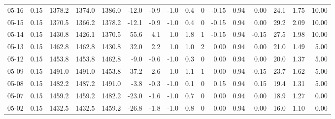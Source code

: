 \begin{threeparttable}
{\begin{tabular}{lrrrrrrrrrrrrrrr}
  05-16 &     0.15 & 1378.2 & 1374.0 & 1386.0 &      -12.0 &           -0.9 &                     -1.0 &                 0.4 &              0 &      -0.15 &      0.94 &           0.00 &             24.1 &            1.75 &                  10.00 \\
  05-15 &     0.15 & 1370.5 & 1366.2 & 1378.2 &      -12.1 &           -0.9 &                     -1.0 &                 0.4 &              0 &      -0.15 &      0.94 &           0.00 &             29.2 &            2.09 &                  10.00 \\
  05-14 &     0.15 & 1430.8 & 1426.1 & 1370.5 &       55.6 &            4.1 &                      1.0 &                 1.8 &              1 &      -0.15 &      0.94 &          -0.15 &             27.5 &            1.98 &                  10.00 \\
  05-13 &     0.15 & 1462.8 & 1462.8 & 1430.8 &       32.0 &            2.2 &                      1.0 &                 1.0 &              2 &       0.00 &      0.94 &           0.00 &             21.0 &            1.49 &                   5.00 \\
  05-12 &     0.15 & 1453.8 & 1453.8 & 1462.8 &       -9.0 &           -0.6 &                     -1.0 &                 0.3 &              0 &       0.00 &      0.94 &           0.00 &             20.0 &            1.37 &                   5.00 \\
  05-09 &     0.15 & 1491.0 & 1491.0 & 1453.8 &       37.2 &            2.6 &                      1.0 &                 1.1 &              1 &       0.00 &      0.94 &          -0.15 &             23.7 &            1.62 &                   5.00 \\
  05-08 &     0.15 & 1482.2 & 1487.2 & 1491.0 &       -3.8 &           -0.3 &                     -1.0 &                 0.1 &              0 &       0.15 &      0.94 &           0.15 &             19.4 &            1.31 &                   5.00 \\
  05-07 &     0.15 & 1459.2 & 1459.2 & 1482.2 &      -23.0 &           -1.6 &                     -1.0 &                 0.7 &              0 &       0.00 &      0.94 &           0.00 &             18.9 &            1.27 &                   0.00 \\
  05-02 &     0.15 & 1432.5 & 1432.5 & 1459.2 &      -26.8 &           -1.8 &                     -1.0 &                 0.8 &              0 &       0.00 &      0.94 &           0.00 &             16.0 &            1.10 &                   0.00 \\

\end{tabular}}
\end{threeparttable}
